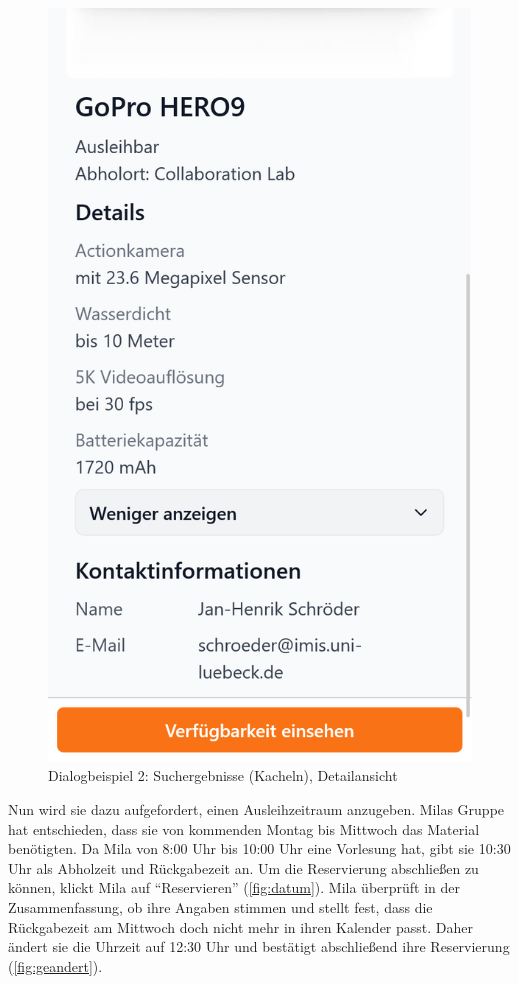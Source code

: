 \begin{figure}[p]
    \includegraphics[scale=0.17]{Bilder/Dialgobeispiel/Details 2.png}
    \caption{Dialogbeispiel 2: Suchergebnisse (Kacheln), Detailansicht}\label{fig:suchen}
\end{figure}

\newpage
Nun wird sie dazu aufgefordert, einen Ausleihzeitraum anzugeben. Milas Gruppe
hat entschieden, dass sie von kommenden Montag bis Mittwoch das Material
benötigten. Da Mila von 8:00 Uhr bis 10:00 Uhr eine Vorlesung hat, gibt sie
10:30 Uhr als Abholzeit und Rückgabezeit an. Um die Reservierung abschließen zu
können, klickt Mila auf \enquote{Reservieren} (\ref{fig:datum}). Mila überprüft in der
Zusammenfassung, ob ihre Angaben stimmen und stellt fest, dass die Rückgabezeit
am Mittwoch doch nicht mehr in ihren Kalender passt. Daher ändert sie die
Uhrzeit auf 12:30 Uhr und bestätigt abschließend ihre Reservierung (\ref{fig:geandert}).

